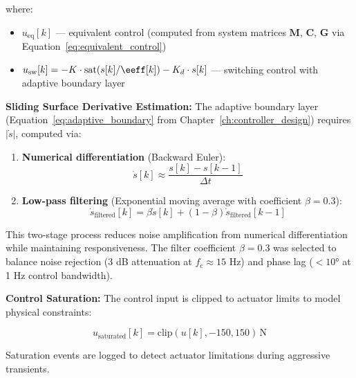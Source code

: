 where:
\begin{itemize}
    \item $u_{\text{eq}}[k]$ --- equivalent control (computed from system matrices $\mathbf{M}$, $\mathbf{C}$, $\mathbf{G}$ via Equation~\ref{eq:equivalent_control})
    \item $u_{\text{sw}}[k] = -K \cdot \text{sat}(s[k]/\eeff[k]) - K_d \cdot s[k]$ --- switching control with adaptive boundary layer
\end{itemize}

\textbf{Sliding Surface Derivative Estimation:}
The adaptive boundary layer (Equation~\ref{eq:adaptive_boundary} from Chapter~\ref{ch:controller_design}) requires $|\dot{s}|$, computed via:

\begin{enumerate}
    \item \textbf{Numerical differentiation} (Backward Euler):
    \begin{equation}
    \label{eq:sliding_derivative}
    \dot{s}[k] \approx \frac{s[k] - s[k-1]}{\Delta t}
    \end{equation}

    \item \textbf{Low-pass filtering} (Exponential moving average with coefficient $\beta = 0.3$):
    \begin{equation}
    \label{eq:derivative_filtering}
    \dot{s}_{\text{filtered}}[k] = \beta \dot{s}[k] + (1 - \beta) \dot{s}_{\text{filtered}}[k-1]
    \end{equation}
\end{enumerate}

This two-stage process reduces noise amplification from numerical differentiation while maintaining responsiveness. The filter coefficient $\beta = 0.3$ was selected to balance noise rejection (3 dB attenuation at $f_c \approx 15$ Hz) and phase lag ($< 10°$ at 1 Hz control bandwidth).

\textbf{Control Saturation:}
The control input is clipped to actuator limits to model physical constraints:

\begin{equation}
\label{eq:control_saturation}
u_{\text{saturated}}[k] = \text{clip}(u[k], -150, 150) \, \text{N}
\end{equation}

Saturation events are logged to detect actuator limitations during aggressive transients.

